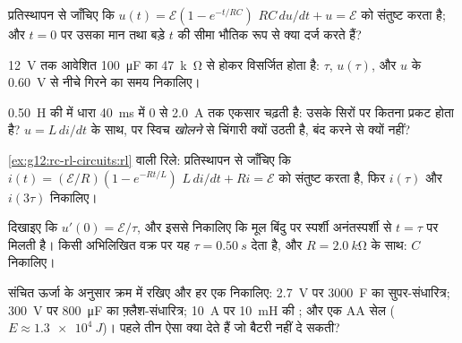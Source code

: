 \begin{exercise}[$\star\star$]\label{exo:g12:rc-rl-circuits:7}
प्रतिस्थापन से जाँचिए कि $u(t) = \mathcal{E}(1 - e^{-t/RC})$ $RC\,du/dt + u = \mathcal{E}$ को संतुष्ट करता है; और $t = 0$ पर
उसका मान तथा बड़े $t$ की सीमा भौतिक रूप से क्या दर्ज करते हैं?
\end{exercise}

\begin{exercise}[$\star\star$]\label{exo:g12:rc-rl-circuits:8}
\qty{12}{V} तक आवेशित \qty{100}{\micro F} का  \qty{47}{k\ohm} से होकर विसर्जित होता
है: $\tau$, $u(\tau)$, और $u$ के \qty{0.60}{V} से नीचे गिरने का समय निकालिए।
\end{exercise}

\begin{exercise}[$\star\star$]\label{exo:g12:rc-rl-circuits:9}
\qty{0.50}{H} की  में धारा \qty{40}{ms} में $0$ से \qty{2.0}{A} तक एकसार
चढ़ती है: उसके सिरों पर कितना  प्रकट होता है? $u = L\,di/dt$ के साथ,
 पर स्विच \emph{खोलने} से चिंगारी क्यों उठती है, बंद करने से
क्यों नहीं?
\end{exercise}

\begin{exercise}[$\star\star$]\label{exo:g12:rc-rl-circuits:10}
\cref{ex:g12:rc-rl-circuits:rl} वाली रिले: प्रतिस्थापन से जाँचिए कि $i(t) = (\mathcal{E}/R)(1 - e^{-Rt/L})$ $L\,di/dt + Ri = \mathcal{E}$ को संतुष्ट करता
है, फिर $i(\tau)$ और $i(3\tau)$ निकालिए।
\end{exercise}

\begin{exercise}[$\star\star$]\label{exo:g12:rc-rl-circuits:11}
दिखाइए कि $u'(0) = \mathcal{E}/\tau$, और इससे निकालिए कि मूल बिंदु पर स्पर्शी अनंतस्पर्शी से
$t = \tau$ पर मिलती है। किसी अभिलिखित वक्र पर यह $\tau = \qty{0.50}{s}$ देता है, और $R = \qty{2.0}{k\ohm}$ के
साथ: $C$ निकालिए।
\end{exercise}

\begin{exercise}[$\star\star\star$]\label{exo:g12:rc-rl-circuits:12}
संचित ऊर्जा के अनुसार क्रम में रखिए और हर एक निकालिए: \qty{2.7}{V} पर
\qty{3000}{F} का सुपर-संधारित्र; \qty{300}{V} पर \qty{800}{\micro F} का फ़्लैश-संधारित्र;
\qty{10}{A} पर \qty{10}{mH} की ; और एक AA सेल ($E \approx \qty{1.3e4}{J}$)। पहले तीन ऐसा
क्या देते हैं जो बैटरी नहीं दे सकती?
\end{exercise}

